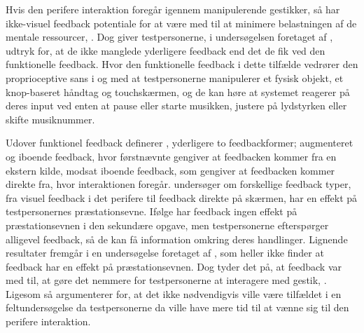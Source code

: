 Hvis den perifere interaktion foregår igennem manipulerende gestikker, så har ikke-visuel feedback potentiale for at være med til at minimere belastningen af de mentale ressourcer, \parencite[s. 3]{PDF:FacilitatingPIDesignAndEvaluation}. Dog giver testpersonerne, i undersøgelsen foretaget af \textcite[s. 173]{PDF:ComparingInputModalities}, udtryk for, at de ikke manglede yderligere feedback end det de fik ved den funktionelle feedback. Hvor den funktionelle feedback i dette tilfælde vedrører den proprioceptive sans i og med at testpersonerne manipulerer et fysisk objekt, et knop-baseret håndtag og touchskærmen, og de kan høre at systemet reagerer på deres input ved enten at pause eller starte musikken, justere på lydstyrken eller skifte musiknummer.

Udover funktionel feedback definerer \textcite[s. 3]{PDF:InteractionFrogger}, yderligere to feedbackformer; augmenteret og iboende feedback, hvor førstnævnte gengiver at feedbacken kommer fra en ekstern kilde, modsat iboende feedback, som gengiver at feedbacken kommer direkte fra, hvor interaktionen foregår. \blankline
%
\textcite[ss. 1263-1268]{PDF:ComparingModFeedback} undersøger om forskellige feedback typer, fra visuel feedback i det perifere til feedback direkte på skærmen, har en effekt på testpersonernes præstationsevne. Ifølge \textcite[ss. 1267-1268]{PDF:ComparingModFeedback} har feedback ingen effekt på præstationsevnen i den sekundære opgave, men testpersonerne efterspørger alligevel feedback, så de kan få information omkring deres handlinger. Lignende resultater fremgår i en undersøgelse foretaget af \textcite[s. 8]{PDF:DoThatThere}, som heller ikke finder at feedback har en effekt på præstationsevnen. Dog tyder det på, at feedback var med til, at gøre det nemmere for testpersonerne at interagere med gestik, \parencite[s. 8]{PDF:DoThatThere}. Ligesom \textcite[s. 174]{PDF:ComparingInputModalities} så argumenterer \textcite[s. 1268]{PDF:ComparingModFeedback} for, at det ikke nødvendigvis ville være tilfældet i en feltundersøgelse da testpersonerne da ville have mere tid til at vænne sig til den perifere interaktion. 

